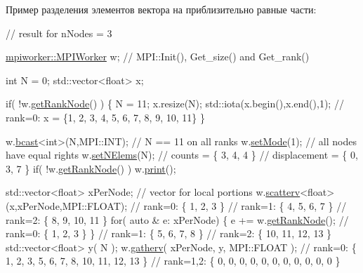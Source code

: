 Пример разделения элементов вектора на приблизительно равные части\-: 
\begin{DoxyCode}
\textcolor{comment}{// result for nNodes = 3}

  \hyperlink{classmpiworker_1_1MPIWorker}{mpiworker::MPIWorker} w;                          \textcolor{comment}{// MPI::Init(), Get\_size() and
       Get\_rank()}

  \textcolor{keywordtype}{int} N = 0; 
  std::vector<float> x; 

  \textcolor{keywordflow}{if}( !w.\hyperlink{classmpiworker_1_1MPIWorker_acbd3bd07d15ffa90a2c112edeecee6e0}{getRankNode}() ) 
  \{ 
      N = 11; 
      x.resize(N);
      std::iota(x.begin(),x.end(),1);              \textcolor{comment}{// rank=0: x = \{1, 2, 3, 4, 5, 6, 7, 8, 9, 10, 11\}}
  \}

  w.\hyperlink{classmpiworker_1_1MPIWorker_ae22bafa8bd4d6515e5b91ef95518c87d}{bcast}<\textcolor{keywordtype}{int}>(N,MPI::INT);                        \textcolor{comment}{// N == 11 on all ranks}
  w.\hyperlink{classmpiworker_1_1MPIWorker_a2ff88f266efae23ec2a12a56bd0472d1}{setMode}(1);                                    \textcolor{comment}{// all nodes have equal rights}
  w.\hyperlink{classmpiworker_1_1MPIWorker_afcce321227c6d15a5fc2145cf59cd54d}{setNElems}(N);                                  \textcolor{comment}{// counts = \{ 3, 4, 4 \}}
                                                   \textcolor{comment}{// displacement  = \{ 0, 3, 7 \}}
  \textcolor{keywordflow}{if}( !w.\hyperlink{classmpiworker_1_1MPIWorker_acbd3bd07d15ffa90a2c112edeecee6e0}{getRankNode}() ) w.\hyperlink{classmpiworker_1_1MPIWorker_ab9f20357773fe10fbe3bc6d92754d4e0}{print}();

  std::vector<float> xPerNode;                     \textcolor{comment}{// vector for local portions}
  w.\hyperlink{classmpiworker_1_1MPIWorker_a24f713941043ab8d54574830a251995b}{scatterv}<\textcolor{keywordtype}{float}>(x,xPerNode,MPI::FLOAT);        \textcolor{comment}{// rank=0: \{ 1, 2, 3 \}}
                                                   \textcolor{comment}{// rank=1: \{ 4, 5, 6, 7 \}}
                                                   \textcolor{comment}{// rank=2: \{ 8, 9, 10, 11 \}}
  \textcolor{keywordflow}{for}( \textcolor{keyword}{auto} & e: xPerNode)
  \{
      e += w.\hyperlink{classmpiworker_1_1MPIWorker_acbd3bd07d15ffa90a2c112edeecee6e0}{getRankNode}();                        \textcolor{comment}{// rank=0: \{ 1, 2, 3 \}}
  \}                                                \textcolor{comment}{// rank=1: \{ 5, 6, 7, 8 \}}
                                                   \textcolor{comment}{// rank=2: \{ 10, 11, 12, 13 \}}
  std::vector<float> y( N );
  w.\hyperlink{classmpiworker_1_1MPIWorker_aff6b4d55cb55caa37c9a0cb08b3c5661}{gatherv}( xPerNode, y, MPI::FLOAT );            \textcolor{comment}{// rank=0: \{ 1, 2, 3, 5, 6, 7, 8, 10, 11, 12, 13
       \}}
                                                   \textcolor{comment}{// rank=1,2: \{ 0, 0, 0, 0, 0, 0, 0, 0, 0, 0, 0 \}}


\end{DoxyCode}
